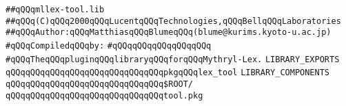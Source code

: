 \label{src/app/makelib/tools/mllex/mllex-tool.lib}
\verb|##qQQqmllex-tool.lib|\newline
\verb|##qQQq(C)qQQq2000qQQqLucentqQQqTechnologies,qQQqBellqQQqLaboratories|\newline
\verb|##qQQqAuthor:qQQqMatthiasqQQqBlumeqQQq(blume@kurims.kyoto-u.ac.jp)|\newline
\newline
\verb|#qQQqCompiledqQQqby:|\newline
\verb|#qQQqqQQqqQQqqQQqqQQq|\newline
\newline
\newline
\verb|#qQQqTheqQQqpluginqQQqlibraryqQQqforqQQqMythryl-Lex.|\newline
\newline
\newline
\newline
\newline
\verb|LIBRARY_EXPORTS|\newline
\newline
\verb|qQQqqQQqqQQqqQQqqQQqqQQqqQQqqQQqpkgqQQqlex_tool|\newline
\newline
\newline
\newline
\verb|LIBRARY_COMPONENTS|\newline
\newline
\verb|qQQqqQQqqQQqqQQqqQQqqQQqqQQqqQQq$ROOT/|\newline
\verb|qQQqqQQqqQQqqQQqqQQqqQQqqQQqqQQqtool.pkg|\newline

